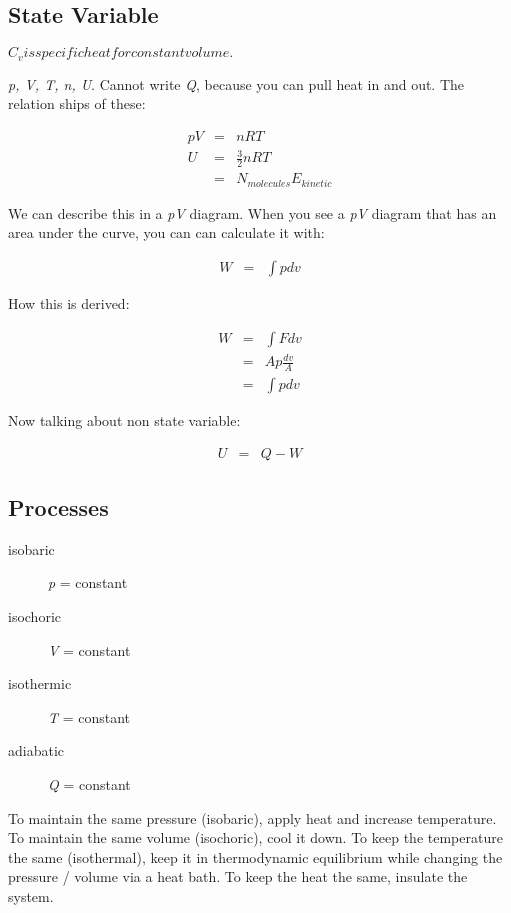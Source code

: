 \documentclass{article}
\begin{document}
\subsection{State Variable}
\textbf{$C_v is specific heat for constant volume.$}

\textit{p, V, T, n, U}. Cannot write \textit{Q}, because you can pull heat in and out. The relation ships of these:

\begin{eqnarray*}
pV & = & nRT \\
U & = & \frac{3}{2} nRT \\
& = & N_{molecules} E_{kinetic}
\end{eqnarray*}

We can describe this in a \textit{pV} diagram. When you see a \textit{pV} diagram that has an area under the curve, you can can calculate it with:

\begin{eqnarray*}
W & = & \int p dv
\end{eqnarray*}

How this is derived:

\begin{eqnarray*}
W & = & \int F dv \\
& = & Ap \frac{dv}{A} \\
& = & \int p dv
\end{eqnarray*}

Now talking about non state variable:

\begin{eqnarray}
U & = & Q - W
\end{eqnarray}

\subsection{Processes}
\begin{description}
\item [isobaric] \textit{p} = constant
\item [isochoric] \textit{V} = constant
\item [isothermic] \textit{T} = constant
\item [adiabatic] \textit{Q} = constant
\end{description}

To maintain the same pressure (isobaric), apply heat and increase temperature. To maintain the same volume (isochoric), cool it down. To keep the temperature the same (isothermal), keep it in thermodynamic equilibrium while changing the pressure / volume via a heat bath. To keep the heat the same, insulate the system.
\end{document}
